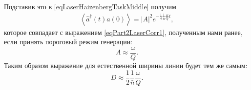 Подставив это в \eqref{eqLaserHaizenbergTaskMiddle} получим
\begin{eqnarray}
\left<\hat{a}^{\dag}\left(t\right)\hat{a}\left(0\right)\right> =
\left|A\right|^2 e^{-\frac{1}{4}\frac{1}{\bar{n}}\frac{\omega}{Q} t},
\label{eqLaserHaizenbergTaskMiddleFinal}
\end{eqnarray}
которое совпадает с выражением \eqref{eqPart2LaserCorr1}, полученным
нами ранее, если принять пороговый режим генерации: 
\[
A \approx \frac{\omega}{Q}.
\]
Таким образом выражение для естественной ширины линии будет тем же
самым:
\[
D \approx \frac{1}{2}\frac{1}{\bar{n}}\frac{\omega}{Q}.
\]

